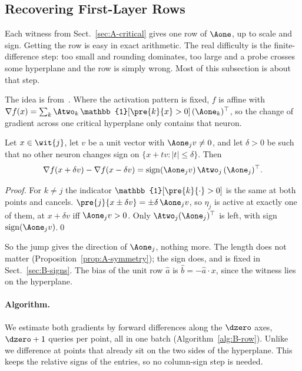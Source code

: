 \subsection{Recovering First-Layer Rows}
\label{sec:B-rows}

Each witness from Sect.~\ref{sec:A-critical} gives one row of $\Aone$, up to
scale and sign. Getting the row is easy in exact arithmetic. The real
difficulty is the finite-difference step: too small and rounding dominates,
too large and a probe crosses some hyperplane and the row is simply wrong.
Most of this subsection is about that step.

The idea is from~\cite[\S4.2]{DBLP:conf/crypto/CarliniJM20}. Where the
activation pattern is fixed, $f$ is affine with
$\nabla f(x)=\sum_{k}\Atwo_k\,\mathbb{1}[\pre{k}{x}>0]\,(\Aone_k)^{\top}$, so the
change of gradient across one critical hyperplane only contains that neuron.

\begin{proposition}\label{prop:B-jump}
Let $x\in\wit{j}$, let $v$ be a unit vector with $\Aone_j v\neq0$, and let
$\delta>0$ be such that no other neuron changes sign on
$\{x+tv: |t|\le\delta\}$. Then
\begin{equation}\label{eq:B-jump}
  \nabla f(x+\delta v)-\nabla f(x-\delta v)
  =\operatorname{sign}(\Aone_j v)\,\Atwo_j\,(\Aone_j)^{\top}.
\end{equation}
\end{proposition}

\begin{proof}
For $k\neq j$ the indicator $\mathbb{1}[\pre{k}{\cdot}>0]$ is the same at both
points and cancels. $\pre{j}{x\pm\delta v}=\pm\delta\,\Aone_j v$, so $\eta_j$ is
active at exactly one of them, at $x+\delta v$ iff $\Aone_j v>0$. Only
$\Atwo_j(\Aone_j)^{\top}$ is left, with sign $\operatorname{sign}(\Aone_j v)$.\qed
\end{proof}

So the jump gives the direction of $\Aone_j$, nothing more. The length does not
matter (Proposition~\ref{prop:A-symmetry}); the sign does, and is fixed in
Sect.~\ref{sec:B-signs}. The bias of the unit row $\hat a$ is $\hat b=-\hat a\cdot x$,
since the witness lies on the hyperplane.

\paragraph{Algorithm.}
We estimate both gradients by forward differences along the $\dzero$ axes,
$\dzero+1$ queries per point, all in one batch (Algorithm~\ref{alg:B-row}).
Unlike~\cite[\S5.2]{DBLP:conf/crypto/CarliniJM20} we difference at points that
already sit on the two sides of the hyperplane. This keeps the relative signs
of the entries, so no column-sign step is needed.

